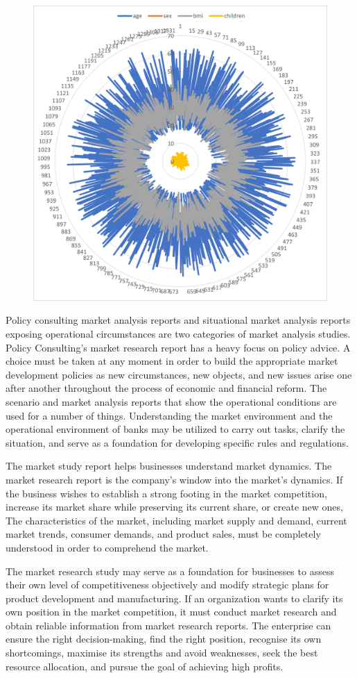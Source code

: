 \documentclass[journal]{IEEEtran}
\begin{document}
\begin{figure}[h]
  \centering
  \includegraphics [width= 3.55 in]{10.png}
\caption{}
  \label{storage}
\end{figure}

\par Policy consulting market analysis reports and situational market analysis reports exposing operational circumstances are two categories of market analysis studies. Policy Consulting's market research report has a heavy focus on policy advice. A choice must be taken at any moment in order to build the appropriate market development policies as new circumstances, new objects, and new issues arise one after another throughout the process of economic and financial reform. The scenario and market analysis reports that show the operational conditions are used for a number of things. Understanding the market environment and the operational environment of banks may be utilized to carry out tasks, clarify the situation, and serve as a foundation for developing specific rules and regulations.

\par The market study report helps businesses understand market dynamics. The market research report is the company's window into the market's dynamics. If the business wishes to establish a strong footing in the market competition, increase its market share while preserving its current share, or create new ones, The characteristics of the market, including market supply and demand, current market trends, consumer demands, and product sales, must be completely understood in order to comprehend the market.

\par The market research study may serve as a foundation for businesses to assess their own level of competitiveness objectively and modify strategic plans for product development and manufacturing. If an organization wants to clarify its own position in the market competition, it must conduct market research and obtain reliable information from market research reports. The enterprise can ensure the right decision-making, find the right position, recognise its own shortcomings, maximise its strengths and avoid weaknesses, seek the best resource allocation, and pursue the goal of achieving high profits.
\end{document}
